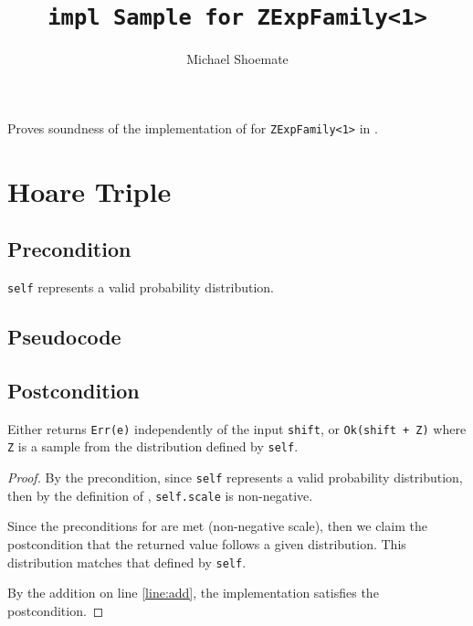 \documentclass{article}
\title{\texttt{impl Sample for ZExpFamily<1>}}
\author{Michael Shoemate}
\date{}
\begin{document}
\maketitle

\contrib
Proves soundness of the implementation of  for \texttt{ZExpFamily<1>} in .

\section{Hoare Triple}
\subsection*{Precondition}
\texttt{self} represents a valid probability distribution.

\subsection*{Pseudocode}


\subsection*{Postcondition}
\begin{theorem}
    \label{postcondition}
    Either returns \texttt{Err(e)} independently of the input \texttt{shift},
    or \texttt{Ok(shift + Z)} where \texttt{Z} is a sample from the distribution defined by \texttt{self}.
\end{theorem}

\begin{proof}
    By the precondition, since \texttt{self} represents a valid probability distribution, 
    then by the definition of ,
    \texttt{self.scale} is non-negative.

    Since the preconditions for  are met (non-negative scale),
    then we claim the postcondition that the returned value follows a given distribution.
    This distribution matches that defined by \texttt{self}.

    By the addition on line \ref{line:add}, the implementation satisfies the postcondition.
\end{proof}
\end{document}
